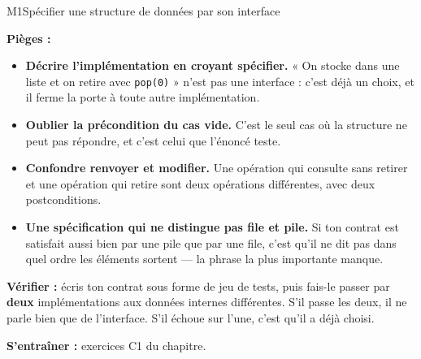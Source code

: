 \begin{fichemethode}{M1}{Spécifier une structure de données par son interface}
%
%
%

\textbf{Pièges :}
\begin{itemize}
  \item \textbf{Décrire l'implémentation en croyant spécifier.} « On stocke dans une liste et
    on retire avec \lstinline{pop(0)} » n'est pas une interface : c'est déjà un choix, et il
    ferme la porte à toute autre implémentation.
  \item \textbf{Oublier la précondition du cas vide.} C'est le seul cas où la structure ne
    peut pas répondre, et c'est celui que l'énoncé teste.
  \item \textbf{Confondre renvoyer et modifier.} Une opération qui consulte sans retirer et
    une opération qui retire sont deux opérations différentes, avec deux postconditions.
  \item \textbf{Une spécification qui ne distingue pas file et pile.} Si ton contrat est
    satisfait aussi bien par une pile que par une file, c'est qu'il ne dit pas dans quel
    ordre les éléments sortent — la phrase la plus importante manque.
\end{itemize}

\textbf{Vérifier :} écris ton contrat sous forme de jeu de tests, puis fais-le passer par
\textbf{deux} implémentations aux données internes différentes. S'il passe les deux, il ne
parle bien que de l'interface. S'il échoue sur l'une, c'est qu'il a déjà choisi.

\textbf{S'entraîner :} exercices C1 du chapitre.
\end{fichemethode}
